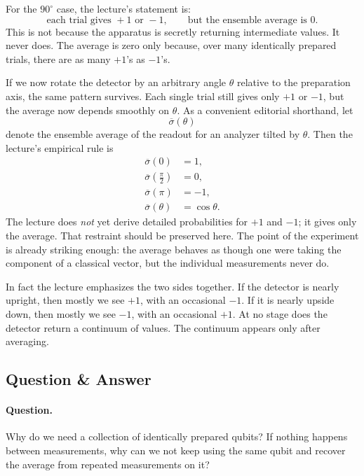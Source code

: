 For the \(90^\circ\) case, the lecture's statement is:
\begin{equation}
\text{each trial gives }+1\text{ or }-1,
\qquad
\text{but the ensemble average is }0.
\end{equation}
This is not because the apparatus is secretly returning intermediate values. It never does. The average is zero only because, over many identically prepared trials, there are as many \(+1\)'s as \(-1\)'s.

If we now rotate the detector by an arbitrary angle \(\theta\) relative to the preparation axis, the same pattern survives. Each single trial still gives only \(+1\) or \(-1\), but the average now depends smoothly on \(\theta\). As a convenient editorial shorthand, let
\begin{equation}
\overline{\sigma}(\theta)
\end{equation}
denote the ensemble average of the readout for an analyzer tilted by \(\theta\). Then the lecture's empirical rule is
\begin{align}
\overline{\sigma}(0) &= 1,\\
\overline{\sigma}\!\left(\frac{\pi}{2}\right) &= 0,\\
\overline{\sigma}(\pi) &= -1,\\
\overline{\sigma}(\theta) &= \cos\theta.
\end{align}
The lecture does \emph{not} yet derive detailed probabilities for \(+1\) and \(-1\); it gives only the average. That restraint should be preserved here. The point of the experiment is already striking enough: the average behaves as though one were taking the component of a classical vector, but the individual measurements never do.

In fact the lecture emphasizes the two sides together. If the detector is nearly upright, then mostly we see \(+1\), with an occasional \(-1\). If it is nearly upside down, then mostly we see \(-1\), with an occasional \(+1\). At no stage does the detector return a continuum of values. The continuum appears only after averaging.

\subsection{Question \& Answer}

\paragraph{Question.} Why do we need a collection of identically prepared qubits? If nothing happens between measurements, why can we not keep using the same qubit and recover the average from repeated measurements on it?


